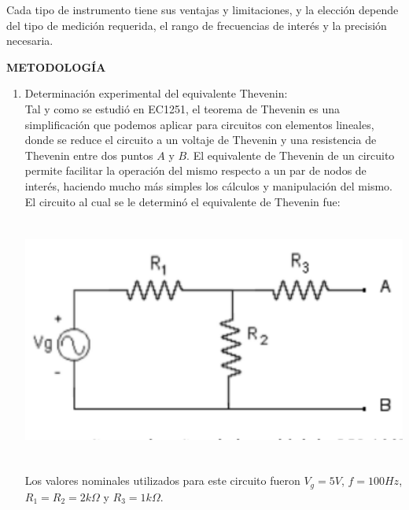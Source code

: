 \documentclass[12pt]{article}
\begin{document}
	Cada tipo de instrumento tiene sus ventajas y limitaciones, y la elección depende del tipo de medición requerida, el rango de frecuencias de interés y la precisión necesaria.

	\newpage
	
	\begin{center}
		\textbf{\large METODOLOGÍA}\\
	\end{center}
	
	\renewcommand{\theenumi}{\alph{enumi}} %
	
	\begin{enumerate}
		
		\item Determinación experimental del equivalente Thevenin:\\
		
		Tal y como se estudió en EC1251, el teorema de Thevenin es una simplificación que podemos aplicar para circuitos con elementos lineales, donde se reduce el circuito a un voltaje de Thevenin y una resistencia de Thevenin entre dos puntos $A$ y $B$. El equivalente de Thevenin de un circuito permite facilitar la operación del mismo respecto a un par de nodos de interés, haciendo mucho más simples los cálculos y manipulación del mismo. El circuito al cual se le determinó el equivalente de Thevenin fue:
		
		\begin{center}
			\includegraphics[width=16cm,height=8cm]{Img/circ_1}
		\end{center}
		
		Los valores nominales utilizados para este circuito fueron $V_g = 5V$, $f = 100Hz$, $R_1 = R_2 = 2k\Omega$ y $R_3 = 1k\Omega$.\\
		

\end{enumerate}
\end{document}
